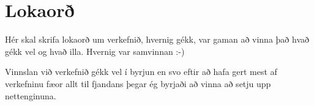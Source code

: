 \section{Lokaorð}
Hér skal skrifa lokaorð um verkefnið, hvernig gékk, var gaman að vinna það hvað gékk vel og hvað illa. Hvernig var samvinnan :-) \cite{brock}

Vinnslan við verkefnið gékk vel í byrjun en svo eftir að hafa gert mest af verkefninu fæor allt til fjandans þegar ég byrjaði að vinna að setju upp nettenginuna.